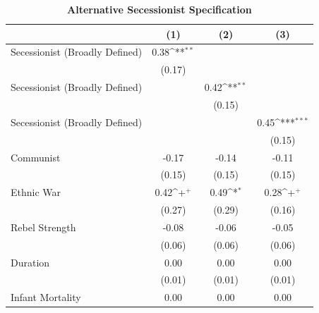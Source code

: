 \documentclass[12pt, letterpaper]{article}
\begin{document}
\newpage
\begin{table}[htbp]\centering
\begin{small}
\def\sym#1{\ifmmode^{#1}\else\(^{#1}\)\fi}
\renewcommand\thetable{A.\Roman{table}}
\caption{\textbf{Alternative Secessionist Specification }}
\makeatletter
\def\myrow{}
\CT@everycr{\noalign{%
\global\let\CT@row@color\relax
\stepcounter{mym9}%
\ifnum\value{mym9}=2
  \gdef\myrow{\rowcolor{gray!50}}
\else\ifnum\value{mym9}=8
  \gdef\myrow{}
\fi\fi
}\myrow}
\label{table:altsec}
\begin{tabular}{l*{3}{c}}
\hline\hline
                    &\multicolumn{1}{c}{(1)}&\multicolumn{1}{c}{(2)}&\multicolumn{1}{c}{(3)}\\
\hline
Secessionist (Broadly Defined)&        0.38\sym{**} &                     &                     \\
                    &      (0.17)         &                     &                     \\
Secessionist (Broadly Defined)&                     &        0.42\sym{**} &                     \\
                    &                     &      (0.15)         &                     \\
Secessionist (Broadly Defined)&                     &                     &        0.45\sym{***}\\
                    &                     &                     &      (0.15)         \\
Communist           &       -0.17         &       -0.14         &       -0.11         \\
                    &      (0.15)         &      (0.15)         &      (0.15)         \\
Ethnic War          &        0.42\sym{+}  &        0.49\sym{*}  &        0.28\sym{+}  \\
                    &      (0.27)         &      (0.29)         &      (0.16)         \\
Rebel Strength      &       -0.08         &       -0.06         &       -0.05         \\
                    &      (0.06)         &      (0.06)         &      (0.06)         \\
Duration            &        0.00         &        0.00         &        0.00         \\
                    &      (0.01)         &      (0.01)         &      (0.01)         \\
Infant Mortality    &        0.00         &        0.00         &        0.00         \\

\end{tabular}
\end{small}
\end{table}
\end{document}

